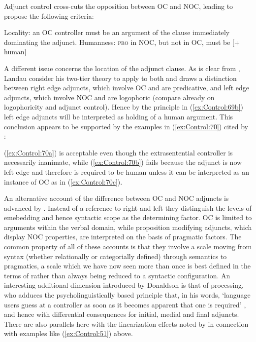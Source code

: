 \documentclass[output=paper,hidelinks]{langscibook}
\begin{document}
Adjunct control cross-cuts the opposition between OC and NOC, leading \citet[21]{Landau2021} to propose the following criteria:


\ea\label{ex:Control:69}
\ea\label{ex:Control:69a} Locality: an OC controller must be an
argument of the clause immediately dominating the adjunct.
\ex\label{ex:Control:69b} Humanness: \textsc{pro} in NOC, but not in OC, must be [+ human]
\z\z
            
A different issue concerns the location of the adjunct clause. As is clear from , Landau consider his two-tier theory to apply to both and draws a distinction between right edge adjuncts, which involve OC and are predicative, and left edge adjuncts, which involve NOC and are logophoric (compare already \citealt{Williams1992} on logophoricity and adjunct control). Hence by the principle in (\ref{ex:Control:69b}) left edge adjuncts will be interpreted as holding of a human argument. This conclusion appears to be supported by the examples in (\ref{ex:Control:70}) cited by \citet{Donaldson2021b}:

\ea\label{ex:Control:70}
\z\z

\noindent
(\ref{ex:Control:70a}) is acceptable even though the extrasentential controller is necessarily inanimate, while (\ref{ex:Control:70b}) fails because the adjunct is now left edge and therefore is required to be human unless it can be interpreted as an instance of OC as in (\ref{ex:Control:70c}).

An alternative account of the difference between OC and NOC adjuncts is advanced by \citet{FischerHoyem,FischerHoyem2022}. Instead of a reference to right and left they distinguish the levels of emebedding and hence syntactic scope as the determining factor. OC is limited to arguments within the verbal domain, while proposition modifying adjuncts, which display NOC properties, are interpreted on the basis of pragmatic factors. The common property of all of these accounts is that they involve a scale moving from syntax (whether relationally or categorially defined) through semantics to pragmatics, a scale which we have now seen more than once is best defined in the terms of \citet{Haug2013,Haug2014b} rather than always being reduced to a syntactic configuration. An interesting additional dimension introduced by Donaldson is that of processing, who adduces the psycholinguistically based principle that, in his words, `language users guess at a controller as soon as it becomes apparent that one is required' \citep[100]{Donaldson2021b}, and hence with differential consequences for initial, medial and final adjuncts. There are also parallels here with the linearization effects noted by \citet{Haug2017} in connection with examples like (\ref{ex:Control:51}) above.
\end{document}
